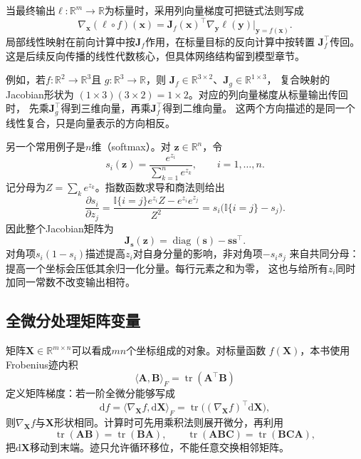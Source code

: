 当最终输出$\ell:\mathbb{R}^m\to\mathbb{R}$为标量时，采用列向量梯度可把链式法则写成
\[   \nabla_{\bm{x}}(\ell\circ f)(\bm{x})   =   \bm{J}_f(\bm{x})^{\top}   \nabla_{\bm{y}}\ell(\bm{y})\big|_{\bm{y}=f(\bm{x})}. \]
局部线性映射在前向计算中按$\bm{J}_f$作用，在标量目标的反向计算中按转置 $\bm{J}_f^{\top}$传回。这是后续反向传播的线性代数核心，但具体网络结构留到模型章节。

例如，若$f:\mathbb{R}^2\to\mathbb{R}^3$且
$g:\mathbb{R}^3\to\mathbb{R}$，则
$\bm{J}_f\in\mathbb{R}^{3\times2}$、$\bm{J}_g\in\mathbb{R}^{1\times3}$，
复合映射的Jacobian形状为
$(1\times3)(3\times2)=1\times2$。对应的列向量梯度从标量输出传回时，
先乘$\bm{J}_g^{\top}$得到三维向量，再乘$\bm{J}_f^{\top}$得到二维向量。
这两个方向描述的是同一个线性复合，只是向量表示的方向相反。

另一个常用例子是$n$维（softmax）。对
$\bm{z}\in\mathbb{R}^n$，令
\[
  s_i(\bm{z})
  =
  \frac{e^{z_i}}{\sum_{k=1}^n e^{z_k}},
  \qquad i=1,\ldots,n.
\]
记分母为$Z=\sum_k e^{z_k}$。指数函数求导和商法则给出
\[
  \frac{\partial s_i}{\partial z_j}
  =
  \frac{\mathbb{I}\{i=j\}e^{z_i}Z-e^{z_i}e^{z_j}}{Z^2}
  =
  s_i\bigl(\mathbb{I}\{i=j\}-s_j\bigr).
\]
因此整个Jacobian矩阵为
\begin{equation}
  \bm{J}_{\bm{s}}(\bm{z})
  =
  \operatorname{diag}(\bm{s})-\bm{s}\bm{s}^{\top}.
\label{eq:analysis-softmax-jacobian}
\end{equation}
对角项$s_i(1-s_i)$描述提高$z_i$对自身分量的影响，非对角项$-s_is_j$
来自共同分母：提高一个坐标会压低其余归一化分量。每行元素之和为零，
这也与给所有$z_i$同时加同一常数不改变输出相符。
\subsection{全微分处理矩阵变量}

矩阵$\bm{X}\in\mathbb{R}^{m\times n}$可以看成$mn$个坐标组成的对象。对标量函数 $f(\bm{X})$，本书使用Frobenius迹内积
\[   \langle\bm{A},\bm{B}\rangle_F   =   \operatorname{tr}(\bm{A}^{\top}\bm{B}) \]
定义矩阵梯度：若一阶全微分能够写成
\begin{equation}
  \mathrm{d}f
  =
  \langle\nabla_{\bm{X}}f,\mathrm{d}\bm{X}\rangle_F
  =
  \operatorname{tr}\bigl((\nabla_{\bm{X}}f)^{\top}
  \mathrm{d}\bm{X}\bigr),
\label{eq:analysis-matrix-gradient-definition}
\end{equation}
则$\nabla_{\bm{X}}f$与$\bm{X}$形状相同。计算时可先用乘积法则展开微分，再利用
\[   \operatorname{tr}(\bm{A}\bm{B})   =\operatorname{tr}(\bm{B}\bm{A}),\qquad   \operatorname{tr}(\bm{A}\bm{B}\bm{C})   =\operatorname{tr}(\bm{B}\bm{C}\bm{A}), \]
把$\mathrm{d}\bm{X}$移动到末端。迹只允许循环移位，不能任意交换相邻矩阵。
